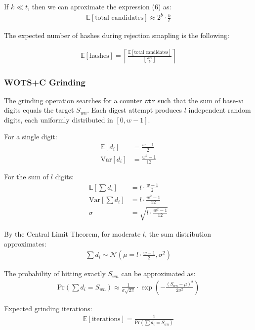 If $k \ll t$, then we can aproximate the expression (6) as:
\begin{align}
    \mathbb{E}\left[\text{total candidates}\right] \approx 2^b\cdot\frac{k}{t}
\end{align}

The expected number of hashes during rejection smapling is the following: 

\begin{align}
    \mathbb{E}[\text{hashes}] = \left\lceil \frac{\mathbb{E}[\text{total candidates}]}{\left\lfloor \frac{256}{b}\right\rfloor}\right\rceil
\end{align}


\subsubsection{WOTS+C Grinding}
The grinding operation searches for a counter $\texttt{ctr}$ such that the sum of base-$w$ digits equals the target $S_{wn}$. Each digest attempt produces $l$ independent random digits, each uniformly distributed in $[0, w-1]$.

For a single digit:
\begin{align}
    \mathbb{E}[d_i] &= \frac{w-1}{2} \\
    \text{Var}[d_i] &= \frac{w^2-1}{12}
\end{align}

For the sum of $l$ digits:
\begin{align}
    \mathbb{E}\left[\sum d_i\right] &= l \cdot \frac{w-1}{2} \\
    \text{Var}\left[\sum d_i\right] &= l \cdot \frac{w^2-1}{12} \\
    \sigma &= \sqrt{l \cdot \frac{w^2-1}{12}}
\end{align}

By the Central Limit Theorem, for moderate $l$, the sum distribution approximates:
\begin{align}
\sum d_i \sim \mathcal{N}\left(\mu = l \cdot \frac{w-1}{2}, \sigma^2\right)
\end{align}

The probability of hitting exactly $S_{wn}$ can be approximated as:
\begin{align}
    \text{Pr}\left(\sum d_i = S_{wn}\right) \approx \frac{1}{\sigma\sqrt{2\pi}} \cdot \exp\left(-\frac{(S_{wn} - \mu)^2}{2\sigma^2}\right)
\end{align}

Expected grinding iterations:
\begin{align}
    \mathbb{E}[\text{iterations}] = \frac{1}{\text{Pr}(\sum d_i = S_{wn})}
\end{align}

